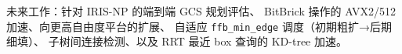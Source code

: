 \documentclass[journal]{IEEEtran}
\begin{document}
未来工作：针对 IRIS-NP 的端到端 GCS 规划评估、
BitBrick 操作的 AVX2/512 加速、向更高自由度平台的扩展、
自适应 \texttt{ffb\_min\_edge} 调度（初期粗扩→后期细填）、
子树间连接检测、以及 RRT 最近 box 查询的 KD-tree 加速。



\end{document}
